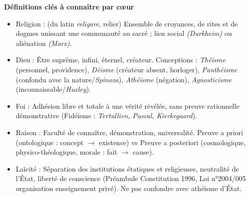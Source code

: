 \documentclass[11pt]{article}
\newcommand{\cle}[1]{{\popxbold\color{popdark}#1}}
\begin{document}
\begin{aretenir}

\textbf{Définitions clés à connaître par cœur}
\begin{itemize}
    \item \cle{Religion} : (du latin \emph{religare}, relier) Ensemble de croyances, de rites et de dogmes unissant une communauté au sacré ; lien social \emph{(Durkheim)} ou aliénation \emph{(Marx)}.
    \item \cle{Dieu} : Être suprême, infini, éternel, créateur. Conceptions : \emph{Théisme} (personnel, providence), \emph{Déisme} (créateur absent, horloger), \emph{Panthéisme} (confondu avec la nature/\emph{Spinoza}), \emph{Athéisme} (négation), \emph{Agnosticisme} (inconnaissable/\emph{Huxley}).
    \item \cle{Foi} : Adhésion libre et totale à une vérité révélée, sans preuve rationnelle démonstrative (Fidéisme : \emph{Tertullien, Pascal, Kierkegaard}).
    \item \cle{Raison} : Faculté de connaître, démonstration, universalité. \cle{Preuve a priori} (ontologique : concept $\to$ existence) vs \cle{Preuve a posteriori} (cosmologique, physico-théologique, morale : fait $\to$ cause).
    \item \cle{Laïcité} : Séparation des institutions étatiques et religieuses, neutralité de l'État, liberté de conscience (Préambule Constitution 1996, Loi n°2004/005 organisation enseignement privé). Ne pas confondre avec athéisme d'État.
\end{itemize}


\end{aretenir}
\end{document}
